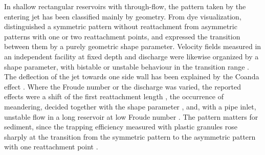 \begin{en}[I-2]
In shallow rectangular reservoirs with through-flow, the pattern taken by the entering jet has been classified mainly by geometry. From dye visualization, \citet{dufresneClassificationFlowPatterns2010} distinguished a symmetric pattern without reattachment from asymmetric patterns with one or two reattachment points, and expressed the transition between them by a purely geometric shape parameter. Velocity fields measured in an independent facility at fixed depth and discharge were likewise organized by a shape parameter, with bistable or unstable behaviour in the transition range \citep{camnasioExperimentalStudyVelocity2011}. The deflection of the jet towards one side wall has been explained by the Coanda effect \citep{dewalsExperimentalNumericalAnalysis2008,camnasioExperimentalStudyVelocity2011}. Where the Froude number or the discharge was varied, the reported effects were a shift of the first reattachment length \citep{dufresneClassificationFlowPatterns2010}, the occurrence of meandering, decided together with the shape parameter \citep{peltierExperimentalInvestigationMeandering2014}, and, with a pipe inlet, unstable flow in a long reservoir at low Froude number \citep{chagdaliFlowPatternsShallow2025}. The pattern matters for sediment, since the trapping efficiency measured with plastic granules rose sharply at the transition from the symmetric pattern to the asymmetric pattern with one reattachment point \citep{dufresneExperimentalInvestigationFlow2010}.
\end{en}
